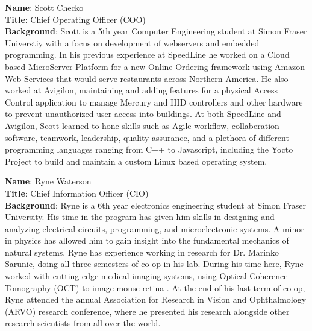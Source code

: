 \bigskip
\bigskip
\textbf{Name}: Scott Checko\\
\medskip
\textbf{Title}: Chief Operating Officer (COO)\\
\medskip
\textbf{Background}:
Scott is a 5th year Computer Engineering student at Simon Fraser Universtiy with a focus on development of webservers and embedded programming.
In his previous experience at SpeedLine he worked on a Cloud based MicroServer Platform for a new Online Ordering framework using Amazon Web Services that would serve restaurants across Northern America.
He also worked at Avigilon, maintaining and adding features for a physical Access Control application to manage Mercury and HID controllers and other hardware to prevent unauthorized user access into buildings.
At both SpeedLine and Avigilon, Scott learned to hone skills such as Agile workflow, collaberation software, teamwork, leadership, quality assurance, and a plethora of different programming languages ranging from C++ to Javascript, including the Yocto Project to build and maintain a custom Linux based operating system.


\pagebreak
\textbf{Name}: Ryne Waterson\\
\medskip
\textbf{Title}: Chief Information Officer (CIO)\\
\medskip
\textbf{Background}: Ryne is a 6th year electronics engineering student at Simon Fraser University. His time in the program has given him skills in designing and analyzing electrical circuits, programming, and microelectronic systems. A minor in physics has allowed him to gain insight into the fundamental mechanics of natural systems. Ryne has experience working in research for Dr. Marinko Sarunic, doing all three semesters of co-op in his lab. During his time here, Ryne worked with cutting edge medical imaging systems, using Optical Coherence Tomography (OCT) to image mouse retina . At the end of his last term of co-op, Ryne attended the annual Association for Research in Vision and Ophthalmology (ARVO) research conference, where he presented his research alongside other research scientists from all over the world.  

